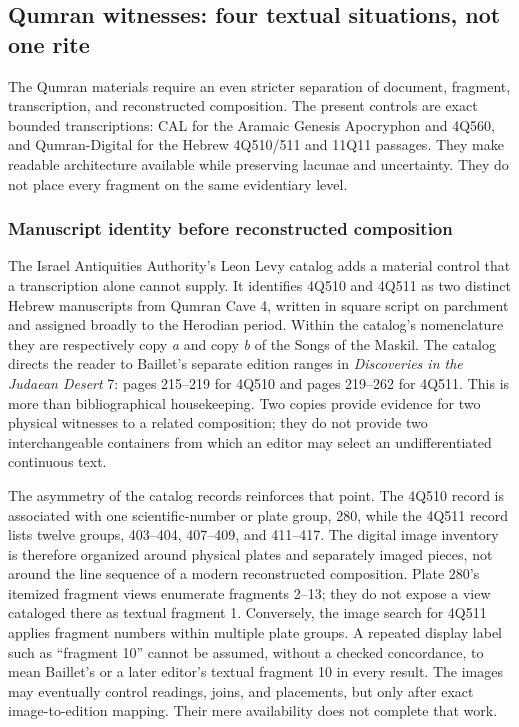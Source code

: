 \subsection{Qumran witnesses: four textual situations, not one rite}

The Qumran materials require an even stricter separation of document,
fragment, transcription, and reconstructed composition. The present controls
are exact bounded transcriptions: CAL for the Aramaic Genesis Apocryphon and
4Q560, and Qumran-Digital for the Hebrew 4Q510/511 and 11Q11 passages. They
make readable architecture available while preserving lacunae and uncertainty.
They do not place every fragment on the same evidentiary level.

\subsubsection{Manuscript identity before reconstructed composition}

The Israel Antiquities Authority's Leon Levy catalog adds a material control
that a transcription alone cannot supply. It identifies 4Q510 and 4Q511 as
two distinct Hebrew manuscripts from Qumran Cave 4, written in square script
on parchment and assigned broadly to the Herodian period. Within the catalog's
nomenclature they are respectively copy \emph{a} and copy \emph{b} of the
Songs of the Maskil. The catalog directs the reader to Baillet's separate
edition ranges in \emph{Discoveries in the Judaean Desert} 7: pages 215--219
for 4Q510 and pages 219--262 for 4Q511. This is more than bibliographical
housekeeping. Two copies provide evidence for two physical witnesses to a
related composition; they do not provide two interchangeable containers from
which an editor may select an undifferentiated continuous text.

The asymmetry of the catalog records reinforces that point. The 4Q510 record
is associated with one scientific-number or plate group, 280, while the 4Q511
record lists twelve groups, 403--404, 407--409, and 411--417. The digital
image inventory is therefore organized around physical plates and separately
imaged pieces, not around the line sequence of a modern reconstructed
composition. Plate 280's itemized fragment views enumerate fragments 2--13;
they do not expose a view cataloged there as textual fragment 1. Conversely,
the image search for 4Q511 applies fragment numbers within multiple plate
groups. A repeated display label such as ``fragment 10'' cannot be assumed,
without a checked concordance, to mean Baillet's or a later editor's textual
fragment 10 in every result. The images may eventually control readings,
joins, and placements, but only after exact image-to-edition mapping. Their
mere availability does not complete that work.


